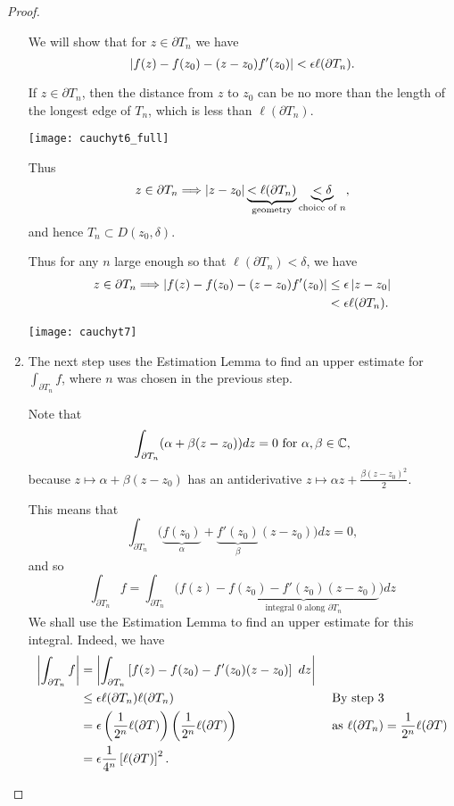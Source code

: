 \begin{proof}
\begin{enumerate}
We will show that for $z \in \partial T_n$ we have
\[
\left| f(z)-f(z_0)-(z-z_0)f'(z_0) \right|<\epsilon \ell ( \partial T_n).
\]

If $z \in \partial T_n$, then the distance from $z$ to $z_0$ can be no more than the length of the longest edge of $T_n$, which is less than $\ell ( \partial T_n)$.
\begin{center}
\texttt{[image: cauchyt6\_full]}
\end{center}
Thus
\[
z \in \partial T_n \Longrightarrow \left| z-z_0 \right| \underbrace{< \ell (\partial T_n) }_{\text{geometry}} \underbrace{< \delta}_{\text{choice of }n},
\]
and hence $T_n \subset D(z_0,\delta)$.

Thus for any $n$ large enough so that $\ell ( \partial T_n) < \delta$, we have
\begin{align*}
z \in \partial T_n \Longrightarrow \left| f(z)-f(z_0)-(z-z_0)f'(z_0) \right| &\leq \epsilon \left| z-z_0 \right| \\
& < \epsilon \ell ( \partial T_n).
\end{align*}
\begin{center}
\texttt{[image: cauchyt7]}
\end{center}

\item The next step uses the Estimation Lemma to find an upper estimate for $\int_{\partial T_n} f$, where $n$ was chosen in the previous step.  

Note that
\[
\int_{\partial T_n} (\alpha+\beta(z-z_0)) dz =0 \text{ for }\alpha,\beta \in \mathbb{C},
\]
because $z \mapsto \alpha + \beta (z-z_0)$ has an antiderivative $z \mapsto \alpha z + \frac{\beta(z-z_0)^2}{2}$.


This means that
\[
\int_{\partial T_n} {\Big(} \underbrace{f(z_0)}_{\alpha}+\underbrace{f'(z_0)}_{\beta} (z-z_0) {\Big)} dz =0,
\]
and so
\[
\int_{\partial T_n} f = \int_{\partial T_n} {\Big(} f(z)-\underbrace{f(z_0)-f'(z_0)(z-z_0)}_{\text{integral }0\text{ along } \partial T_n} {\Big)} dz
\]
We shall use the Estimation Lemma to find an upper estimate for this integral.  Indeed, we have
\begin{align*}
\left| \int_{\partial T_n} f \right| & = \left| \int_{\partial T_n} \left[ f(z)-f(z_0)-f'(z_0)(z-z_0) \right]\ dz \right| &&\\
& \leq \epsilon \ell ( \partial T_n ) \ell ( \partial T_n) &&\text{ By step 3} \\
& = \epsilon \left( \frac{1}{2^n} \ell ( \partial T ) \right) \left( \frac{1}{2^n} \ell ( \partial T) \right) && \text{ as } \ell (\partial T_n) = \frac{1}{2^n} \ell ( \partial T) \\
& = \epsilon \frac{1}{4^n} \left[ \ell ( \partial T) \right]^2.
\end{align*}





\end{enumerate}
\end{proof}
